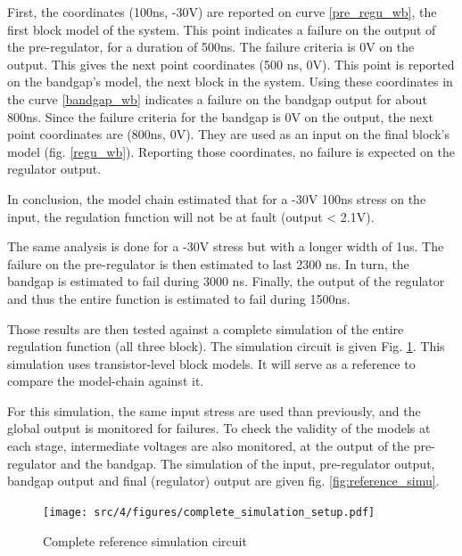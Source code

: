 First, the coordinates (100ns, -30V) are reported on curve \ref{pre_regu_wb}, the first block model of the system.
This point indicates a failure on the output of the pre-regulator, for a duration of 500ns.
The failure criteria is 0V on the output.
This gives the next point coordinates (500 ns, 0V).
This point is reported on the bandgap's model, the next block in the system.
Using these coordinates in the curve \ref{bandgap_wb} indicates a failure on the bandgap output for about 800ns.
Since the failure criteria for the bandgap is 0V on the output, the next point coordinates are (800ns, 0V).
They are used as an input on the final block's model (fig. \ref{regu_wb}).
Reporting those coordinates, no failure is expected on the regulator output.

In conclusion, the model chain estimated that for a -30V 100ns stress on the input, the regulation function will not be at fault (output < 2.1V).

The same analysis is done for a -30V stress but with a longer width of 1us.
The failure on the pre-regulator is then estimated to last 2300 ns.
In turn, the bandgap is estimated to fail during 3000 ns.
Finally, the output of the regulator and thus the entire function is estimated to fail during 1500ns.

Those results are then tested against a complete simulation of the entire regulation function (all three block).
The simulation circuit is given Fig. \ref{fig:reference_simu_circuit}.
This simulation uses transistor-level block models.
It will serve as a reference to compare the model-chain against it.

For this simulation, the same input stress are used than previously, and the global output is monitored for failures.
To check the validity of the models at each stage, intermediate voltages are also monitored, at the output of the pre-regulator and the bandgap.
The simulation of the input, pre-regulator output, bandgap output and final (regulator) output are given fig. \ref{fig:reference_simu}.

\begin{figure}[!h]
  \centering
  \texttt{[image: src/4/figures/complete\_simulation\_setup.pdf]}
  \caption{Complete reference simulation circuit}
  \label{fig:reference_simu_circuit}
\end{figure}

